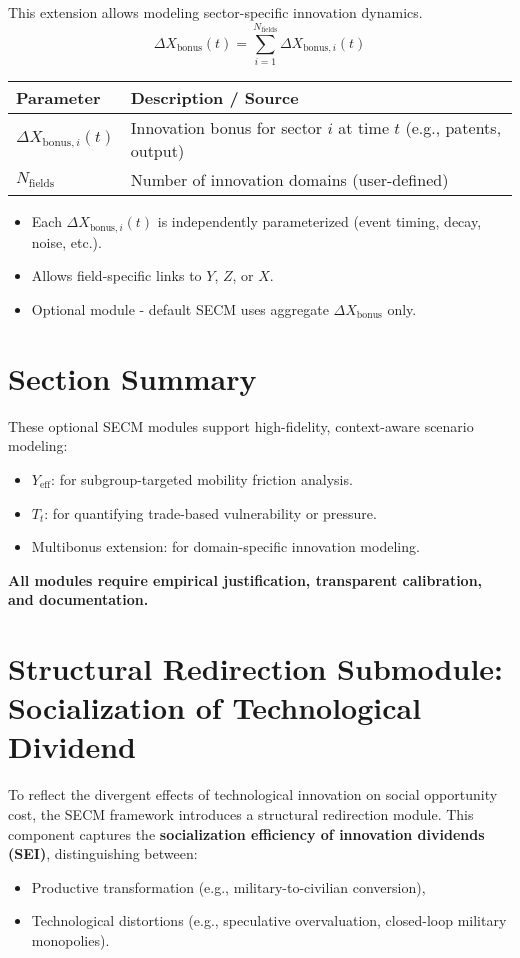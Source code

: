 \documentclass[12pt]{report}
\begin{document}
This extension allows modeling sector-specific innovation dynamics.
\[
\Delta X_{\text{bonus}}(t) = \sum_{i=1}^{N_{\text{fields}}} \Delta X_{\text{bonus},i}(t)
\]

\begin{table}[H]
\centering
\begin{tabular}{|l|p{8cm}|}
\hline
\textbf{Parameter} & \textbf{Description / Source} \\
\hline
$\Delta X_{\text{bonus},i}(t)$ & Innovation bonus for sector $i$ at time $t$ (e.g., patents, output) \\
$N_{\text{fields}}$ & Number of innovation domains (user-defined) \\
\hline
\end{tabular}
\end{table}

\begin{itemize}
  \item Each $\Delta X_{\text{bonus},i}(t)$ is independently parameterized (event timing, decay, noise, etc.).
  \item Allows field-specific links to $Y$, $Z$, or $X$.
  \item Optional module - default SECM uses aggregate $\Delta X_{\text{bonus}}$ only.
\end{itemize}

\section*{Section Summary}
These optional SECM modules support high-fidelity, context-aware scenario modeling:
\begin{itemize}
  \item $Y_{\text{eff}}$: for subgroup-targeted mobility friction analysis.
  \item $T_t$: for quantifying trade-based vulnerability or pressure.
  \item Multibonus extension: for domain-specific innovation modeling.
\end{itemize}

\textbf{All modules require empirical justification, transparent calibration, and documentation.}

\section{Structural Redirection Submodule: Socialization of Technological Dividend}

To reflect the divergent effects of technological innovation on social opportunity cost, the SECM framework introduces a structural redirection module. This component captures the \textbf{ socialization efficiency of innovation dividends (SEI)}, distinguishing between:
\begin{itemize}
  \item Productive transformation (e.g., military-to-civilian conversion),
  \item Technological distortions (e.g., speculative overvaluation, closed-loop military monopolies).
\end{itemize}
\end{document}
